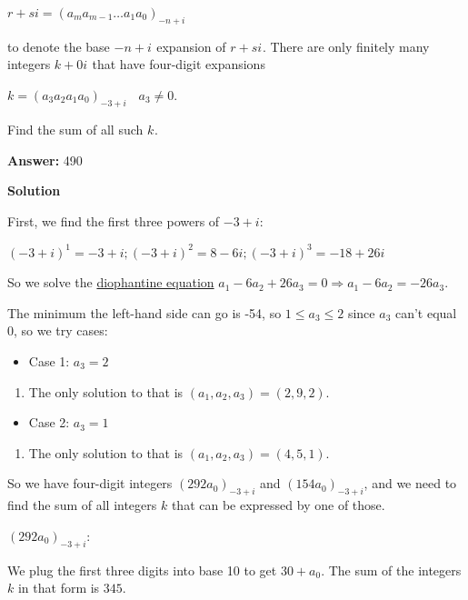 \begin{enumerate}
 $r+si=(a_ma_{m-1}\ldots a_1a_0)_{-n+i}$

 to denote the base $-n+i^{}_{}$ expansion of $r+si^{}_{}$. There are only finitely many integers $k+0i^{}_{}$ that have four-digit expansions


 $k=(a_3a_2a_1a_0)_{-3+i^{}_{}}~~~~a_3\ne 0.$

 Find the sum of all such $k^{}_{}$.


 
 \textbf{Answer: }490



\textbf{Solution}

First, we find the first three powers of $-3+i$:

 $(-3+i)^1=-3+i ; (-3+i)^2=8-6i ; (-3+i)^3=-18+26i$

 So we solve the \href{https://artofproblemsolving.com/wiki/index.php?title=Diophantine\_equation}{diophantine equation} $a_1-6a_2+26a_3=0 \Longrightarrow a_1-6a_2=-26a_3$.

 The minimum the left-hand side can go is -54, so $1\leq a_3 \leq 2$ since $a_3$ can't equal 0, so we try cases:

 
            \begin{itemize}
        \item Case 1: $a_3=2$
            \end{itemize}
            
            \begin{enumerate}[label=(\roman*)]
                \item The only solution to that is $(a_1, a_2, a_3)=(2,9,2)$.
            \end{enumerate}
            
            \begin{itemize}
        \item Case 2: $a_3=1$
            \end{itemize}
            
            \begin{enumerate}[label=(\roman*)]
                \item The only solution to that is $(a_1, a_2, a_3)=(4,5,1)$.
            \end{enumerate}
            So we have four-digit integers $(292a_0)_{-3+i}$ and $(154a_0)_{-3+i}$, and we need to find the sum of all integers $k$ that can be expressed by one of those.

 $(292a_0)_{-3+i}$:

 We plug the first three digits into base 10 to get $30+a_0$. The sum of the integers $k$ in that form is $345$.


\end{enumerate}
